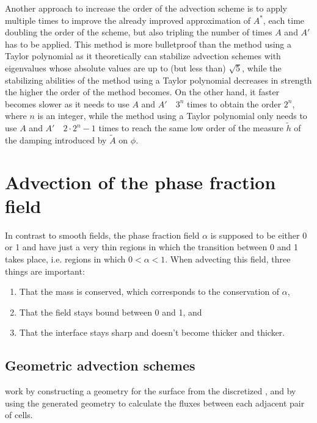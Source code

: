 Another approach to increase the order of the advection scheme is to apply \BFECC multiple times to improve the already improved approximation of $A^*$, each time doubling the order of the scheme, but also tripling the number of times $A$ and $A'$ has to be applied. This method is more bulletproof than the method using a Taylor polynomial as it theoretically can stabilize advection schemes with eigenvalues whose absolute values are up to (but less than) $\sqrt{5}$, while the stabilizing abilities of the method using a Taylor polynomial decreases in strength the higher the order of the method becomes. On the other hand, it faster becomes slower as it needs to use $A$ and $A'$\ \ $3^n$ times to obtain the order $2^n$, where $n$ is an integer, while the method using a Taylor polynomial only needs to use $A$ and $A'$\ \ $2\cdot 2^n - 1$ times to reach the same low order of the measure $\tilde{h}$ of the damping introduced by $\tilde{A}$ on $\phi$.

\section{Advection of the phase fraction field}

\label{sec:advection_of_phase_fraction}

In contrast to smooth fields, the phase fraction field $\alpha$ is supposed to be either 0 or 1 and have just a very thin regions in which the transition between 0 and 1 takes place, i.e. regions in which $0 < \alpha < 1$. When advecting this field, three things are important:

\begin{enumerate}
\item That the mass is conserved, which corresponds to the conservation of $\alpha$,
\item That the field stays bound between 0 and 1, and
\item That the interface stays sharp and doesn't become thicker and thicker.
\end{enumerate}

\subsection{Geometric advection schemes}
\label{sec:geometric_advection_schemes}

 work by constructing a geometry for the surface from the discretized , and by using the generated geometry to calculate the fluxes between each adjacent pair of cells.

